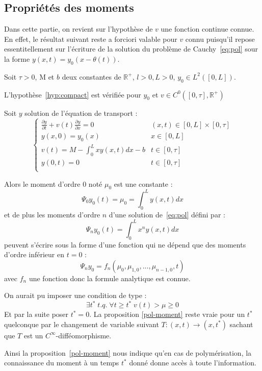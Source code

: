 \documentclass[a4paper]{article}
\newcommand{\mass}{\mathrm{M}}
\newcommand{\dep}{b}
\begin{document}
\subsection{Propriétés des moments}

Dans cette partie, on revient sur l'hypothèse de $v$ une fonction continue connue.
En effet, le résultat suivant reste a forciori valable pour $v$ connu puisqu'il repose essentitellement sur l'écriture de la solution du problème de Cauchy~\eqref{eq:pol} sour la forme $y(x,t)=y_0(x-\theta(t))$.

\begin{proposition}
	\label{pol-moment}
	Soit $\tau>0$, $\mass$ et $\dep$ deux constantes de $\mathbb{R}^+$, 
	$l>0, L>0$, $y_0 \in L^2([0,L])$.
	
	L'hypothèse~\eqref{hyp:compact} est vérifiée pour $y_0$ et $v \in C^0([0,\tau],\mathbb{R}^+)$
	
	Soit $y$ solution de l'équation de transport :
	\begin{equation}
		\label{eq:pol-moment}
		\begin{cases}
			\displaystyle \frac{\partial y}{\partial t}+ v(t) \frac{\partial y} {\partial x}  = 0 & (x,t) \in [0,L] \times [0, \tau] \\
             y(x,0) = y_{0} (x) & x \in [0,L] \\
			 v(t) = M - \int_0^L xy(x,t)dx - \dep & t \in [0,\tau]\\
			 y(0,t) = 0 & t \in [0,\tau]\\
		\end{cases}
	\end{equation}
	
	
	Alors le moment d'ordre 0 noté $\mu_0$ est une constante :
	\[\Psi_0 y_0 (t) = \mu_0 = \int_0^L y(x,t) dx \]
	et de plus les moments d'ordre $n$ d'une solution de~\eqref{eq:pol} défini par :
	\[\Psi_n y_0 (t) = \int_0^L x^n y(x,t) dx \]
	peuvent s'écrire sous la forme d'une fonction qui ne dépend que des moments d'ordre inférieur en $t=0$ :
	\[\Psi_n y_0 = f_n (\mu_{0},\mu_{1,0},..., \mu_{n-1,0},t)\]
	avec $f_n$ une fonction donc la formule analytique est connue.
\end{proposition}



\begin{remarque} 
On aurait pu imposer une condition de type :
\[\exists t^* \; t.q. \; \forall t \geq t^* \; v(t) > \mu \geq 0 \]
Et par la suite poser $t^* = 0$. 
La proposition \ref{pol-moment} reste vraie pour un $t^*$ quelconque par le changement de variable suivant $T: (x,t) \to (x,t^*)$ sachant que $T$ est un $C^\infty$-difféomorphisme.

Ainsi la proposition~\ref{pol-moment} nous indique qu'en cas de polymérisation, 
la connaissance du moment à un temps $t^*$ donné donne accès à toute l'information.
\end{remarque}
\end{document}
